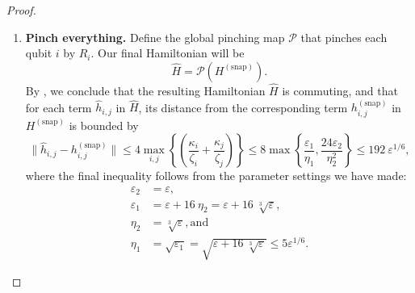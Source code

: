 \documentclass[a4paper,onecolumn,11pt]{quantumarticle}
\theoremstyle{plain}
\newcommand{\eps}{\varepsilon}
\renewcommand{\cP}{\mathcal{P}}
\newcommand{\snp}{{(\mathrm{snap})}}
\begin{document}
\begin{proof}
\begin{enumerate}
Now, we will use transitivity: we know that $\|[B_i^\beta, A_i^{\alpha^*}]\| \leq \eps_2$ and $\|[A_i^{\alpha^*}, R_i]\| \leq \eps_2$, so by , we can conclude that 
\begin{equation}
    \| [B_i^\beta, R_i] \| \leq \frac{6\eps_2}{\Delta(A_i^{\alpha^*})} \leq \frac{6 \eps_2}{\eta_2},
\end{equation}
where we are assuming that $\eps_2 \leq \eta_2$ and moreover that the terms of the Hamiltonian have operator norm at most $1$. So, we have
\[ \| [h^\snp_{i,k}, R_i \otimes I_k ] \| \leq \frac{24\eps_2}{\eta_2}. \]
    \item \textbf{Pinch everything.} Define the global pinching map $\cP$ that pinches each qubit $i$ by $R_i$. Our final Hamiltonian will be
    \[ \widehat{H} = \cP(H^\snp).\]
    By , we conclude that the resulting Hamiltonian $\widehat{H}$ is commuting, and that for each term $\widehat{h}_{i,j}$ in $\widehat{H}$, its distance from the corresponding term $h^\snp_{i,j}$ in $H^\snp$ is bounded by 
    \[ \|\hat{h}_{i,j} - h^\snp_{i,j} \| \leq  4\max_{i,j} \left\{ \left(\frac{\kappa_i}{\zeta_i} + \frac{\kappa_j}{\zeta_j} \right) \right\} \leq 8 \max\left\{ \frac{\eps_1}{\eta_1}, \frac{24\eps_2}{\eta_2^2} \right\} \leq 192\ \eps^{1/6}, \]
where the final inequality follows from the parameter settings we have made:
    \begin{align}
        \eps_2 &= \eps,\\
        \eps_1 &= \eps + 16\ \eta_2 = \eps + 16\ \sqrt[3]{\eps},\\
        \eta_2 &= \sqrt[3]{\eps}, \text{and}\label{ineq:eta_2}\\
        \eta_1 &= \sqrt{\eps_1} = \sqrt{\eps + 16\ \sqrt[3]{\eps}} \leq 5 \eps^{1/6}.\label{ineq:eta_1}
    \end{align}
\end{enumerate}



\end{proof}
\end{document}
